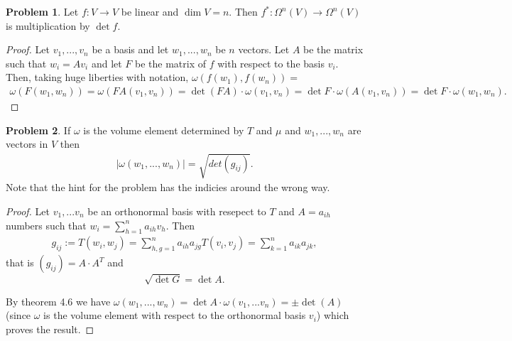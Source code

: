 \documentclass[20pt]{article}
\theoremstyle{plain}
\theoremstyle{definition}
\newtheorem*{problem}{Problem}
\begin{document}
  \begin{problem}{4.2}
    Let $f: V \to V$ be linear and $\dim V = n$.
    Then $f^*: \Omega^n(V) \to \Omega^n(V)$ is multiplication by $\det f$.
  \end{problem}

  \begin{proof}
    Let $v_1, ..., v_n$ be a basis and let $w_1, ..., w_n$ be $n$ vectors.
    Let $A$ be the matrix such that $w_i = Av_i$ and let $F$ be the matrix 
    of $f$ with respect to the basis $v_i$.  Then, taking huge liberties with 
    notation, $\omega(f(w_1), f(w_n)) = $
    \begin{align*}
      \omega(F(w_1,w_n)) = 
      \omega(FA(v_1,v_n)) = 
      \det(FA)\cdot \omega(v_1, v_n) = 
      \det F \cdot \omega(A(v_1, v_n)) = 
      \det F \cdot \omega(w_1, w_n).
    \end{align*}
  \end{proof}


  \begin{problem}{4.3}
    If $\omega$ is the volume element determined by $T$ and $\mu$ and $w_1, ..., w_n$ are vectors in $V$ then 
    \begin{align*}
      |\omega(w_1, ..., w_n)| = \sqrt{det(g_{ij})}.
    \end{align*}    
    Note that the hint for the problem has the indicies around the wrong way.
  \end{problem}
  \begin{proof}
    Let $v_1, ...v_n$ be an orthonormal basis with resepect to $T$ and $A = a_{ih}$ numbers such that 
    $w_i = \sum_{h=1}^n a_{ih}v_h$.
    Then 
    \begin{align*}
      g_{ij} := T(w_i, w_j) = \sum_{h,g=1}^n a_{ih}a_{jg}T(v_i, v_j) = \sum_{k=1}^n a_{ik}a_{jk},
    \end{align*}
    that is $(g_{ij}) = A\cdot A^T$ and
    $$\sqrt{\det G} = \det A.$$

    By theorem 4.6 we have 
    $ \omega(w_1, ..., w_n) = \det A \cdot \omega(v_1, ...v_n) = \pm \det(A)$
    (since $\omega$ is the volume element with respect to the orthonormal basis $v_i$) which proves the result.
  \end{proof}
\end{document}

